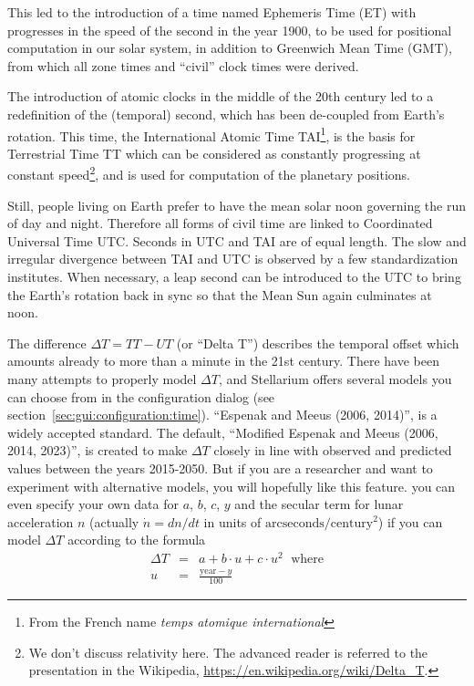 This led to the introduction of a time named Ephemeris Time (ET) with
progresses in the speed of the second in the year 1900, to be used for
positional computation in our solar system, in addition to Greenwich
Mean Time (GMT), from which all zone times and ``civil'' clock times were
derived.

The introduction of atomic clocks in the middle of the 20th century
led to a redefinition of the (temporal) second, which has been
de-coupled from Earth's rotation. This time, the International Atomic
Time TAI\footnote{From the French name \textit{temps atomique international}}, is the basis for Terrestrial Time TT which can be
considered as constantly progressing at constant speed\footnote{We
  don't discuss relativity here. The advanced reader is referred to
  the presentation in the Wikipedia,
  \url{https://en.wikipedia.org/wiki/Delta_T}.}, and is used for
computation of the planetary positions.

Still, people living on Earth prefer to have the mean solar noon
governing the run of day and night. Therefore all forms of civil time
are linked to Coordinated Universal Time UTC. Seconds in UTC and TAI
are of equal length. The slow and irregular divergence between TAI and
UTC is observed by a few standardization institutes.  When necessary,
a leap second can be introduced to the UTC to bring the Earth's
rotation back in sync so that the Mean Sun again culminates at noon.

The difference $\Delta T=TT-UT$ (or ``Delta T'') describes the
temporal offset which amounts already to more than a minute in the 21st
century. There have been many attempts to properly model $\Delta T$,
and Stellarium offers several models you can choose from in the
configuration dialog (see
section~\ref{sec:gui:configuration:time}). ``Espenak and
Meeus (2006, 2014)'', is a widely accepted standard. The default, ``Modified Espenak and
Meeus (2006, 2014, 2023)'', is created to make $\Delta T$ closely in line with observed and predicted
values between the years 2015-2050. But if you are a researcher and want to experiment
with alternative models, you will hopefully like this feature. you can even specify your own data for
$a$, $b$, $c$, $y$ and the secular term for lunar acceleration $n$
(actually $\dot{n}=dn/dt$ in units of
$\mathrm{arcseconds}/\mathrm{century}^2$) if you can model $\Delta T$
according to the formula
\begin{eqnarray}
  \label{eq:DeltaT:custom}
  \Delta T &=& a+ b\cdot u + c \cdot u^2 \, \ \ \text{where}\\
         u &=& \frac{\mathrm{year}-y}{100}
\end{eqnarray}

